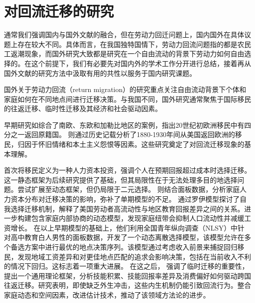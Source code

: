 \documentclass[a4paper,12pt,oneside, fontset=mac]{ctexbook} %
\begin{document}
\section{对回流迁移的研究}

通常我们强调国内与国外文献的融合，但在劳动力回迁问题上，国内国外在具体议题上存在较大不同。具体而言，在我国独特国情下，劳动力回流问题指的都是农民工返潮现象，而国外研究大致都是研究在一个自由流动的背景下劳动力如何自由选择的。在这个前提下，我们有必要先对国内外的学术工作分开进行总结，接着再从国外文献的研究方法中汲取有用的共性以服务于国内研究课题。


国外关于劳动力回流（return migration）的研究重点关注自由流动背景下个体和家庭如何在不同地点间进行迁移决策。与我国不同，国外研究通常聚焦于国际移民的往返迁移、临时性迁移及其经济和社会驱动因素。

早期研究如\cite{gmelchReturnMigration1980}综合了南欧、东欧和加勒比地区的案例，指出20世纪初欧洲移民中有四分之一返回原籍国。
\cite{wymanRoundtripAmericaImmigrants1993}则通过历史记载分析了1880-1930年间从美国返回欧洲的移民，归因于怀旧情绪和本土主义怨恨等因素。这些研究奠定了对回流迁移现象的基本理解。

\cite{sjaastadCostsReturnsHuman1962}首次将移民定义为一种人力资本投资，强调个人在预期回报超过成本时选择迁移。这一静态框架为后续研究提供了基础，但其局限性在于无法处理多目的地选择问题。\cite{tunaliRationalityMigration2000}尝试扩展至动态框架，但仍局限于二元选择。
\cite{dierxLifecycleModelRepeat1988}则结合面板数据，分析家庭人力资本分布对迁移决策的影响，弥补了单期模型的不足。
\cite{dahlMobilityReturnEducation2002} 通过罗伊模型探讨了自我选择迁移机制，解释了美国劳动者高流动性与地区教育回报差异之间的关系。\cite{gemiciFamilyMigrationLabor2007}进一步构建包含家庭内部协商的动态模型，发现家庭纽带会抑制人口流动性并减缓工资增长。
在以上早期模型的基础上，\cite{kennanEffectExpectedIncome2011}他们利用全国青年纵向调查（NLSY）中针对高中教育白人男性的面板数据，开发了一个动态离散选择模型，该模型允许在多个备选方案中进行最优的地点决策序列。该模型通过考虑收入前景来捕捉回归移民，发现地域工资差异和对更佳地点匹配的追求会影响决策，包括在当前收入不利的情况下回归。这标志着一项重大进展。
在这之后，
\cite{dustmannEconomicsTemporaryMigrations2016}强调了临时迁移的重要性，提出一个通用理论框架，分析技能积累、技能回报率差异及消费偏好如何驱动跨国往返迁移。研究表明，即使缺乏外生冲击，这些内生机制仍能引致回流行为。\cite{venatorDualEarnerMigrationDecisions2022}整合家庭动态和空间因素，改进估计技术，推动了该领域方法论的进步。
\end{document}
